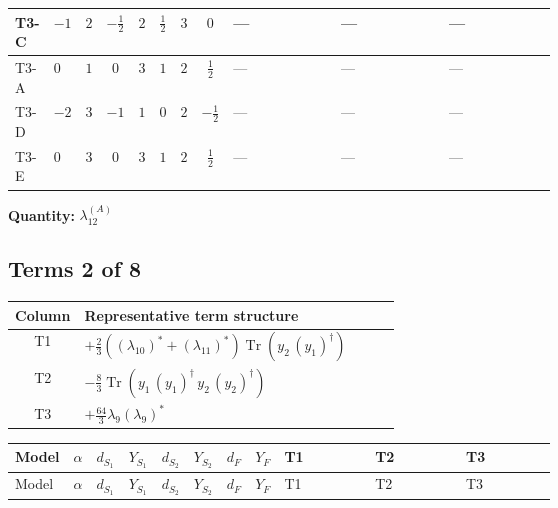 \documentclass[8pt]{article}
\begin{document}
\begin{landscape}
\begin{longtable}{@{}llcccccc >{\raggedright\arraybackslash}p{0.21\linewidth} >{\raggedright\arraybackslash}p{0.21\linewidth} >{\raggedright\arraybackslash}p{0.21\linewidth}@{}}
\midrule
T3-C & $-1$ & $2$ & $-\frac{1}{2}$ & $2$ & $\frac{1}{2}$ & $3$ & $0$ & --- & --- & --- \\
\midrule
T3-A & $0$ & $1$ & $0$ & $3$ & $1$ & $2$ & $\frac{1}{2}$ & --- & --- & --- \\
\midrule
T3-D & $-2$ & $3$ & $-1$ & $1$ & $0$ & $2$ & $-\frac{1}{2}$ & --- & --- & --- \\
\midrule
T3-E & $0$ & $3$ & $0$ & $3$ & $1$ & $2$ & $\frac{1}{2}$ & --- & --- & --- \\
\midrule
\bottomrule
\end{longtable}
\clearpage
\noindent\textbf{Quantity: }$\lambda_{12}^{(A)}$\par\smallskip
\subsection*{Terms 2 of 8}
\begin{center}
\begin{tabular}{@{}c >{\raggedright\arraybackslash}p{0.82\linewidth}@{}}
\toprule
Column & Representative term structure \\
\midrule
T1 & \(\displaystyle +\frac{2}{3} (\left({\lambda_{10}}\right)^{*}+\left({\lambda_{11}}\right)^{*}) \operatorname{Tr}\!\left({y_2}\,\left({y_1}\right)^{\dagger}\right)\) \\
\midrule
T2 & \(\displaystyle -\frac{8}{3} \operatorname{Tr}\!\left({y_1}\,\left({y_1}\right)^{\dagger}\,{y_2}\,\left({y_2}\right)^{\dagger}\right)\) \\
\midrule
T3 & \(\displaystyle +\frac{64}{3} {\lambda_{9}} \left({\lambda_{9}}\right)^{*}\) \\
\midrule
\bottomrule
\end{tabular}
\end{center}
\smallskip
\tiny
\begin{longtable}{@{}llcccccc >{\raggedright\arraybackslash}p{0.21\linewidth} >{\raggedright\arraybackslash}p{0.21\linewidth} >{\raggedright\arraybackslash}p{0.21\linewidth}@{}}
\toprule
Model & $\alpha$ & $d_{S_1}$ & $Y_{S_1}$ & $d_{S_2}$ & $Y_{S_2}$ & $d_F$ & $Y_F$ & T1 & T2 & T3 \\
\midrule
\endfirsthead
\toprule
Model & $\alpha$ & $d_{S_1}$ & $Y_{S_1}$ & $d_{S_2}$ & $Y_{S_2}$ & $d_F$ & $Y_F$ & T1 & T2 & T3 \\
\midrule
\endhead

\end{longtable}
\end{landscape}
\end{document}
